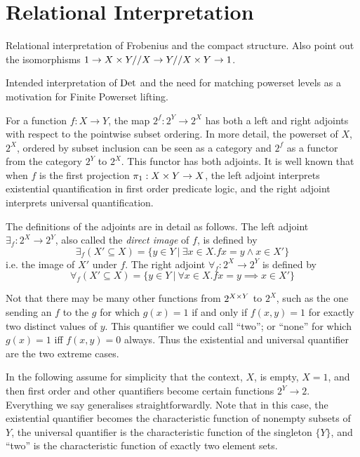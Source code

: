 \section{Relational Interpretation}


Relational interpretation of Frobenius and the compact structure. Also
point out the isomorphisms $1 \to X\times Y // X \to Y // X \times Y \to 1$.

Intended interpretation of $\mathrm{Det}$ and the need for matching powerset
levels as a motivation for Finite Powerset lifting. 

\medskip
For a function $f : X \to Y$, the map $2^f : 2^Y \to 2^X$ has both a
left and right adjoints with respect to the pointwise subset
ordering. In more detail, the powerset of $X$, $2^X$, ordered by
subset inclusion  can be seen as a
category and $2^f$ as a functor from the category $2^Y$ to $2^X$. This
functor has both adjoints. It is well known that when $f$ is the first
projection $\pi_1 : X\times Y \to X$, the left adjoint interprets
existential quantification in first order predicate logic, and the
right adjoint interprets universal quantification. 

The definitions of the adjoints are in detail as follows. 
The left adjoint $\exists_f : 2^X \to 2^Y$, also called the
\emph{direct image} of $f$, is defined by 
\[\exists_f (X' \subseteq X) = \{ y \in Y ~|~ \exists x \in X. f x = y
\wedge x \in X'\} \]
i.e. the image of $X'$ under $f$. The right adjoint $\forall_f : 2^X
\to 2^Y$ is defined by 
%
\[
\forall_f (X' \subseteq X) = \{ y \in Y ~|~ \forall x \in X. f x = y
\implies x \in X' \} \] 
%


Not that there may be many other functions from $2^{X\times Y}$ to $2^X$,
such as the one sending an $f$ to the $g$ for which
$g(x) = 1$ if and only if $f(x,y) = 1$ for exactly two distinct values
of $y$. This quantifier we could call ``two''; or
``none'' for which $g(x)=1$ iff $f(x,y) = 0$ always. Thus the
existential and universal quantifier are the two extreme cases. 


In the following assume for simplicity that the context, $X$, is
empty, $X = 1$, and then first order and other quantifiers become
certain functions $2^Y \to 2$. Everything we say generalises
straightforwardly.  Note that in this case, the existential quantifier
becomes the characteristic function of nonempty subsets of $Y$, the
universal quantifier is the characteristic function of the singleton
$\{Y\}$, and ``two'' is the characteristic function of exactly two
element sets. 

